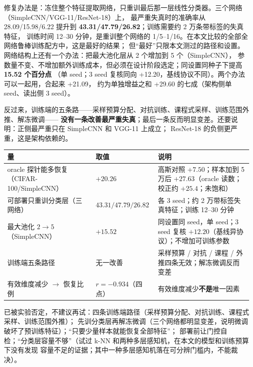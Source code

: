 \documentclass[10pt,a4paper]{ctexart}
\newcommand{\hl}[1]{\textbf{#1}}
\newcommand{\sect}[1]{\vspace{0.06em}\noindent{\normalsize\bfseries #1}\par\vspace{0.00em}}
\begin{document}
修复办法是：冻住整个特征提取网络，只重训最后那一层线性分类器。三个网络（SimpleCNN/VGG-11/ResNet-18）上，
最严重失真时的准确率从 28.09/15.98/6.22 提升到 \hl{43.31/47.79/26.82}；训练需要约 2 万条带标签的失真特征，
训练时间 12--30 分钟，是重训整个网络的 1/5--1/16。在本文比较的全部全网络鲁棒训练配方中，这是最好的结果；
但“最好”只限本文测过的路径和设置。网络结构上还有一个办法：把最大池化层从 2 个增加到 5 个（SimpleCNN），
参数量不变、不增加额外训练成本，但必须在设计阶段选定；同设置同种子下提高 \hl{15.52 个百分点}
（单 seed；3 seed 复核同向 +12.20，基线协议不同）。两个办法可以一起用，合起来 +21.09，
约为单独增益之和 +29.60 的七成（架构侧单 seed、读出侧 3 seed）。

反过来，训练端的五条路——采样预算分配、对抗训练、课程式采样、训练范围外推、解冻微调——
\hl{没有一条改善最严重失真}；最后一条反而明显变差。还要说明：正侧最严重只在 SimpleCNN 和 VGG-11 上成立；
ResNet-18 的负侧更严重，这是架构依赖的。

\sect{三、主要证据一览}
\begin{center}
\footnotesize
\begin{tabular}{>{\raggedright\arraybackslash}p{5.1cm}>{\raggedright\arraybackslash}p{3.0cm}>{\raggedright\arraybackslash}p{8.3cm}}
\toprule
量 & 取值 & 说明 \\
\midrule
oracle 探针能多恢复（CIFAR-100/SimpleCNN） & $\mathbf{+20.26}$ & 高斯对照 $+7.50$；样本加到 5 万后 $+27.63$（oracle 读数；校正约 $+25.4$；未饱和） \\
可部署只重训分类层（三网络） & $\mathbf{43.31/47.79/26.82}$ & 各 3 seed；约 2 万带标签失真特征；训练 12--30 分钟 \\
最大池化 $2\to5$（SimpleCNN） & $\mathbf{+15.52}$ & 同设置同 seed，单 seed；3 seed 复核 $+12.20$（基线异协议）；不增加可训练参数 \\
训练端五条路径 & 无一改善 & 采样预算 / 对抗 / 课程 / 外推四条无效；解冻微调反而变差 \\
有效维度减少 $\to$ 恢复比例 & $r=-0.934$（四点） & 有效维度减少\hl{不是}唯一因素 \\
\bottomrule
\end{tabular}
\end{center}

\sect{四、哪些方向已经试过、不行}
已被实验否定，不建议再试：四条训练端路径（采样预算分配、对抗训练、课程式采样、训练范围外推）；
先训分类层再解冻微调（三个网络都明显变差，说明微调破坏了预训练特征）；“只要少量样本就能恢复全部特征”；
部署前让门控自检；“分类层容量不够”（试过 k-NN 和两种多层感知机，在本文的模型和训练预算下没有发现
容量不足的证据；其中一种多层感知机落在可分辨门槛内，不能裁决）。
\end{document}
